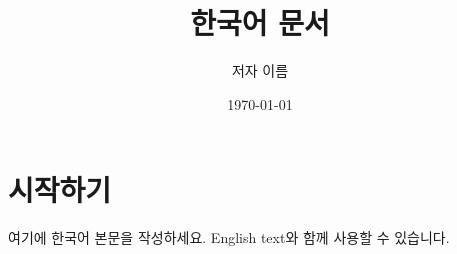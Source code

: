 \documentclass[11pt,a4paper]{article}
\title{한국어 문서}
\author{저자 이름}
\date{\today}
\begin{document}
\maketitle
\section{시작하기}
여기에 한국어 본문을 작성하세요. English text와 함께 사용할 수 있습니다.
\end{document}
